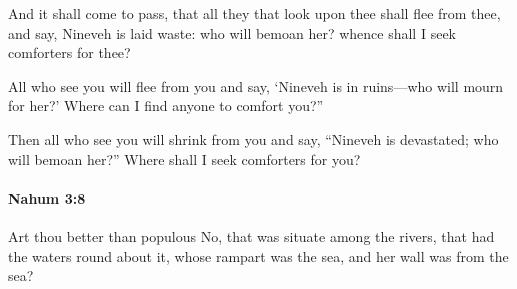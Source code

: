 			\begin{versebox}
					\item[BHS] 
					\item[LXX] 
					\item[ASV] And it shall come to pass, that all they that look upon thee shall flee from thee, and say, Nineveh is laid waste: who will bemoan her? whence shall I seek comforters for thee?
					\item[NIV] All who see you will flee from you and say, ‘Nineveh is in ruins—who will mourn for her?’ Where can I find anyone to comfort you?”
					\item[NRSV] Then all who see you will shrink from you and say, “Nineveh is devastated; who will bemoan her?” Where shall I seek comforters for you?
			\end{versebox}

		\paragraph{Nahum 3:8} %
			\label{NAHUM-3-8}

			Art thou better than populous No, that was situate among the rivers, that had the waters round about it, whose rampart was the sea, and her wall was from the sea?

